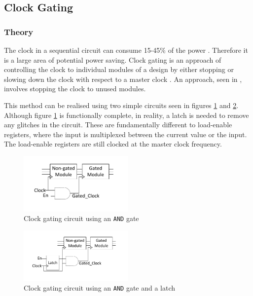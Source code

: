 
\subsection{Clock Gating}

\subsubsection{Theory}

The clock in a sequential circuit can consume 15-45\% of the power \cite{pedram1996power}.
Therefore it is a large area of potential power saving.
Clock gating is an approach of controlling the clock to individual modules of a design by either stopping or slowing down the clock with respect to a master clock \cite{841927}. 
An approach, seen in \cite{tellez1995activity}, involves stopping the clock to unused modules.

This method can be realised using two simple circuits seen in figures \ref{fig:cg:circuit1} and \ref{fig:cg:circuit2}.
Although figure \ref{fig:cg:circuit1} is functionally complete, in reality, a latch is needed to remove any glitches in the circuit.
These are fundamentally different to load-enable registers, where the input is multiplexed between the current value or the input.
The load-enable registers are still clocked at the master clock frequency.

\begin{figure}
\includegraphics[width=0.5\textwidth]{Figures/clockgating_and.pdf}
\caption{Clock gating circuit using an \texttt{AND} gate}
\label{fig:cg:circuit1}
\end{figure}

\begin{figure}
\includegraphics[width=0.5\textwidth]{Figures/clockgating_latch.pdf}
\caption{Clock gating circuit using an \texttt{AND} gate and a latch}
\label{fig:cg:circuit2}
\end{figure}

